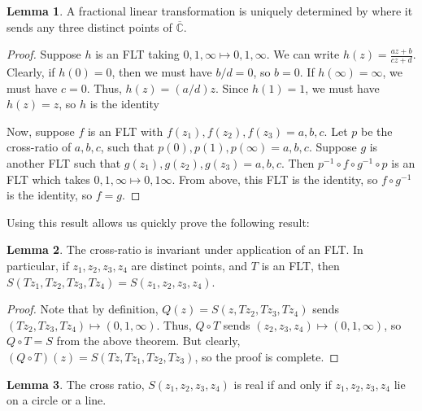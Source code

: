 \documentclass[aps,pra,showpacs,notitlepage,onecolumn,superscriptaddress,nofootinbib]{revtex4-1}
\theoremstyle{definition}
\newtheorem{lemma}{Lemma}[section]
\begin{document}
\begin{lemma}
  A fractional linear transformation is uniquely determined by where it sends any three distinct points of $\overline{\mathbb{C}}$.
\end{lemma}

\begin{proof}
  Suppose $h$ is an FLT taking $0, 1, \infty \mapsto 0, 1, \infty$. We can write $h(z) = \frac{az + b}{cz + d}$.
  Clearly, if $h(0) = 0$, then we must have $b/d = 0$, so $b = 0$. If $h(\infty) = \infty$, we must have $c = 0$. Thus, $h(z) = (a/d) z$. Since $h(1) = 1$, we must have $h(z) = z$, so $h$ is the identity

  Now, suppose $f$ is an FLT with $f(z_1), f(z_2), f(z_3) = a, b, c$. Let $p$ be the cross-ratio of $a, b, c$, such that $p(0), p(1), p(\infty) = a, b, c$. Suppose $g$ is another FLT such that $g(z_1), g(z_2), g(z_3) = a, b, c$.
  Then $p^{-1} \circ f \circ g^{-1} \circ p$ is an FLT which takes $0, 1, \infty \mapsto 0, 1 \infty$.
  From above, this FLT is the identity, so $f \circ g^{-1}$ is the identity, so $f = g$.
\end{proof}

\noindent Using this result allows us quickly prove the following result:

\begin{lemma}
  The cross-ratio is invariant under application of an FLT. In particular, if $z_1, z_2, z_3, z_4$ are distinct points, and $T$ is an FLT, then $S(Tz_1, Tz_2, Tz_3, Tz_4) = S(z_1, z_2, z_3, z_4)$.
\end{lemma}

\begin{proof}
  Note that by definition, $Q(z) = S(z, Tz_2, Tz_3, Tz_4)$ sends $(Tz_2, Tz_3, Tz_4) \mapsto (0, 1, \infty)$. Thus, $Q \circ T$ sends $(z_2, z_3, z_4) \mapsto (0, 1, \infty)$, so $Q \circ T = S$ from the above theorem.
  But clearly, $(Q \circ T)(z) = S(Tz, Tz_1, Tz_2, Tz_3)$, so the proof is complete.
\end{proof}

\begin{lemma}
 The cross ratio, $S(z_1, z_2, z_3, z_4)$ is real if and only if $z_1, z_2, z_3, z_4$ lie on a circle or a line.
\end{lemma}
\end{document}
